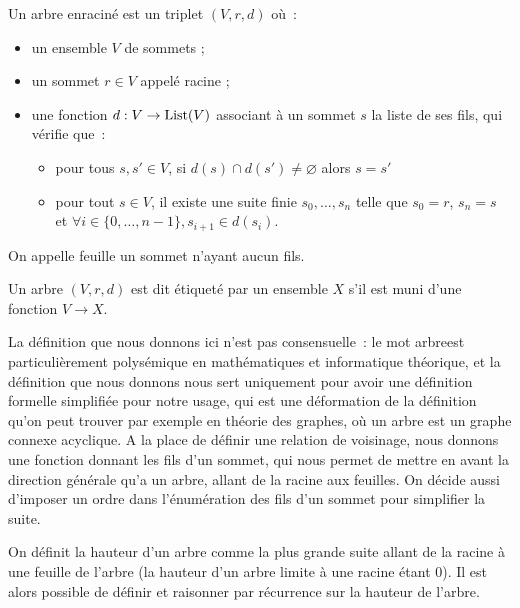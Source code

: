\begin{definition}
  Un arbre enraciné est un triplet $(V,r,d)$ où~:
  \begin{itemize}
  \item un ensemble $V$ de sommets ;
  \item un sommet $r \in V$ appelé racine ;
  \item une fonction $d : V \to \operatorname{List}(V)$ associant à un sommet $s$
    la liste de ses fils, qui vérifie que~:
    \begin{itemize}
    \item pour tous $s,s'\in V$, si $d(s) \cap d(s')\neq\varnothing$ alors
      $s = s'$
    \item pour tout $s \in V$, il existe une suite finie $s_0,\ldots,s_n$ telle
      que $s_0 = r$, $s_n = s$ et
      $\forall i \in \{0,\ldots,n-1\},s_{i+1} \in d(s_i)$.
    \end{itemize}
  \end{itemize}

  On appelle feuille un sommet n'ayant aucun fils.

  Un arbre $(V,r,d)$ est dit étiqueté par un ensemble $X$ s'il est muni d'une
  fonction $V \to X$.
\end{definition}

\begin{remark}
  La définition que nous donnons ici n'est pas consensuelle~: le mot
  \og arbre\fg est particulièrement polysémique en mathématiques et informatique
  théorique, et la définition que nous donnons nous sert uniquement pour avoir
  une définition formelle simplifiée pour notre usage, qui est une déformation
  de la définition qu'on peut trouver par exemple en théorie des graphes, où un
  arbre est un graphe connexe acyclique. A la place de définir une relation de
  voisinage, nous donnons une fonction donnant les fils d'un sommet, qui nous
  permet de mettre en avant la direction générale qu'a un arbre, allant de la
  racine aux feuilles. On décide aussi d'imposer un ordre dans l'énumération des
  fils d'un sommet pour simplifier la suite.
\end{remark}

On définit la hauteur d'un arbre comme la plus grande suite allant de la racine
à une feuille de l'arbre (la hauteur d'un arbre limite à une racine étant $0$).
Il est alors possible de définir et raisonner par récurrence sur la hauteur de
l'arbre.


